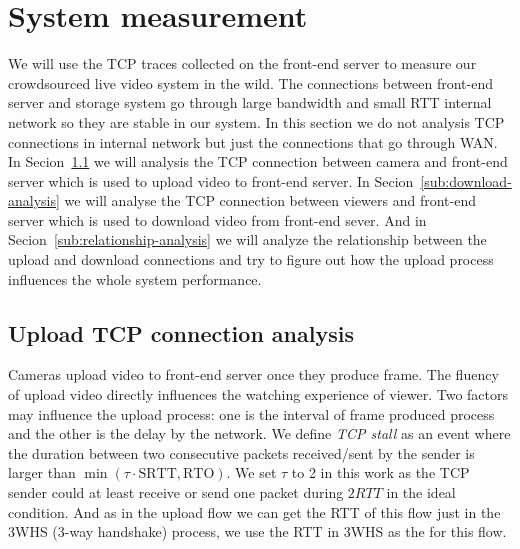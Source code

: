 
\section{System measurement}
\label{sec:system-measurement}

We will use the TCP traces collected on the front-end server to measure our crowdsourced live video system in the wild. The connections between front-end server and storage system go through large bandwidth and small RTT internal network so they are stable in our system.  In this section we do not analysis TCP connections in internal network but just the connections that go through WAN. In Secion~\ref{sub:upload-analysis} we will analysis the TCP connection between camera and front-end server which is used to upload video to front-end server. In Secion~\ref{sub:download-analysis} we will analyse the TCP connection between viewers and front-end server which is used to download video from front-end sever. And in Secion~\ref{sub:relationship-analysis} we will analyze the relationship between the upload and download connections and try to figure out how the upload process influences the whole system performance.

\subsection{Upload TCP connection analysis}
\label{sub:upload-analysis}
Cameras upload video to front-end server once they produce frame. The fluency of upload video directly influences the watching experience of viewer. Two factors may influence the upload process: one is the interval of frame produced process and the other is the delay by the network. We define \emph{TCP stall} as an event where the duration between two consecutive packets received/sent by the sender is larger than $\min(\tau\cdot\text{SRTT}, \text{RTO})$. We set $\tau$ to 2 in this work as the TCP sender could at least receive or send one packet during $2RTT$ in the ideal condition. And as in the upload flow we can get the RTT of this flow just in the 3WHS (3-way handshake) process, we use the RTT in 3WHS as the  for this flow. 

